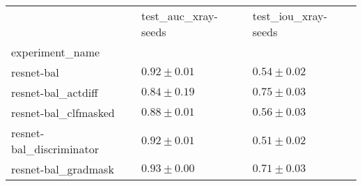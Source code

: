 \begin{tabular}{lll}
\toprule
{} & test_auc_xray-seeds & test_iou_xray-seeds \\
experiment_name          &                     &                     \\
\midrule
resnet-bal               &       $0.92\pm0.01$ &       $0.54\pm0.02$ \\
resnet-bal_actdiff       &       $0.84\pm0.19$ &       $0.75\pm0.03$ \\
resnet-bal_clfmasked     &       $0.88\pm0.01$ &       $0.56\pm0.03$ \\
resnet-bal_discriminator &       $0.92\pm0.01$ &       $0.51\pm0.02$ \\
resnet-bal_gradmask      &       $0.93\pm0.00$ &       $0.71\pm0.03$ \\
\bottomrule
\end{tabular}
